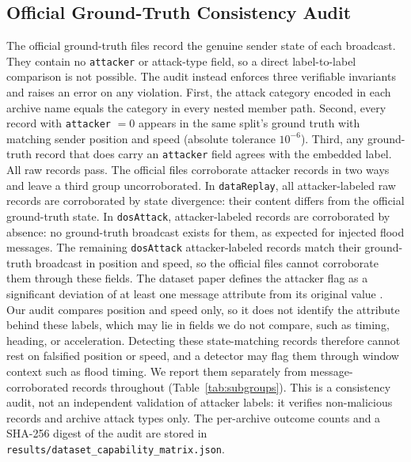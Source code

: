 \documentclass[preprint,12pt,numafflabel]{elsarticle}
\begin{document}
\subsection{Official Ground-Truth Consistency Audit}
The official ground-truth files record the genuine sender state of each broadcast. They contain no \texttt{attacker} or attack-type field, so a direct label-to-label comparison is not possible. The audit instead enforces three verifiable invariants and raises an error on any violation. First, the attack category encoded in each archive name equals the category in every nested member path. Second, every record with \texttt{attacker} $=0$ appears in the same split's ground truth with matching sender position and speed (absolute tolerance $10^{-6}$). Third, any ground-truth record that does carry an \texttt{attacker} field agrees with the embedded label. All raw records pass. The official files corroborate attacker records in two ways and leave a third group uncorroborated. In \texttt{dataReplay}, all \ResAuditReplayDiffers{} attacker-labeled raw records are corroborated by state divergence: their content differs from the official ground-truth state. In \texttt{dosAttack}, \ResAuditDoSNoGT{} attacker-labeled records are corroborated by absence: no ground-truth broadcast exists for them, as expected for injected flood messages. The remaining \ResAuditDoSMatches{} \texttt{dosAttack} attacker-labeled records match their ground-truth broadcast in position and speed, so the official files cannot corroborate them through these fields. The dataset paper defines the attacker flag as a significant deviation of at least one message attribute from its original value \cite{hermann2026veremi}. Our audit compares position and speed only, so it does not identify the attribute behind these labels, which may lie in fields we do not compare, such as timing, heading, or acceleration. Detecting these state-matching records therefore cannot rest on falsified position or speed, and a detector may flag them through window context such as flood timing. We report them separately from message-corroborated records throughout (Table~\ref{tab:subgroups}). This is a consistency audit, not an independent validation of attacker labels: it verifies non-malicious records and archive attack types only. The per-archive outcome counts and a SHA-256 digest of the audit are stored in \texttt{results/dataset\_capability\_matrix.json}.
\end{document}
